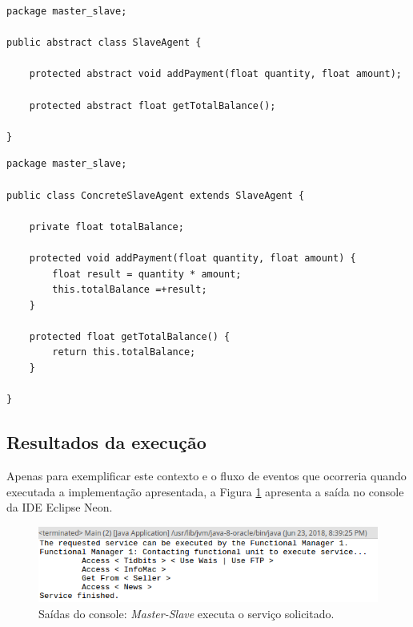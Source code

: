 \begin{lstlisting}
package master_slave;

public abstract class SlaveAgent {

	protected abstract void addPayment(float quantity, float amount);

	protected abstract float getTotalBalance();
	
}
\end{lstlisting}
 


\begin{lstlisting}
package master_slave;

public class ConcreteSlaveAgent extends SlaveAgent {

	private float totalBalance;
	
	protected void addPayment(float quantity, float amount) {
		float result = quantity * amount;
		this.totalBalance =+result;
	}

	protected float getTotalBalance() {
		return this.totalBalance;
	}

}
\end{lstlisting}



\subsection{Resultados da execução}


Apenas para exemplificar este contexto e o fluxo de eventos que ocorreria quando executada a implementação apresentada, a Figura \ref{fig:master_sl_console} apresenta a saída no console da IDE Eclipse Neon.

\begin{figure}[!h]
\centering
\includegraphics[scale=0.7]{figuras/macron/macron_console.png}
\caption{Saídas do console: \textit{Master-Slave} executa o serviço solicitado.}
\label{fig:master_sl_console}
\end{figure}